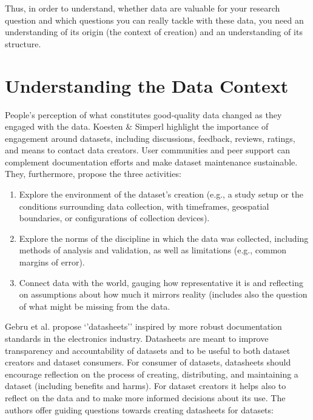 \documentclass[
]{book}
\providecommand{\tightlist}{%
  \setlength{\itemsep}{0pt}\setlength{\parskip}{0pt}}
\begin{document}
Thus, in order to understand, whether data are valuable for your research question and which questions you can really tackle with these data, you need an understanding of its origin (the context of creation) and an understanding of its structure.

\hypertarget{understanding-the-data-context}{%
\section{Understanding the Data Context}\label{understanding-the-data-context}}

People's perception of what constitutes good-quality data changed as they engaged with the data. Koesten \& Simperl \citep{KoestenSimperl2021_dataUX} highlight the importance of engagement around datasets, including discussions, feedback, reviews, ratings, and means to contact data creators. User communities and peer support can complement documentation efforts and make dataset maintenance sustainable. They, furthermore, propose the three activities:

\begin{enumerate}
\def\labelenumi{\arabic{enumi}.}
\tightlist
\item
  Explore the environment of the dataset's creation (e.g., a study setup or the conditions surrounding data collection, with timeframes, geospatial boundaries, or configurations of collection devices).
\item
  Explore the norms of the discipline in which the data was collected, including methods of analysis and validation, as well as limitations (e.g., common margins of error).
\item
  Connect data with the world, gauging how representative it is and reflecting on assumptions about how much it mirrors reality (includes also the question of what might be missing from the data.
\end{enumerate}

Gebru et al. \citep{Gebruetal2018datasheets} propose `'datasheets'' inspired by more robust documentation standards in the electronics industry. Datasheets are meant to improve transparency and accountability of datasets and to be useful to both dataset creators and dataset consumers.
For consumer of datasets, datasheets should encourage reflection on the process of creating, distributing, and maintaining a dataset (including benefits and harms). For dataset creators it helps also to reflect on the data and to make more informed decisions about its use. The authors offer guiding questions towards creating datasheets for datasets:
\end{document}
